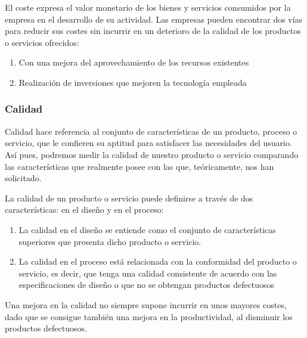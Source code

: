\documentclass[10pt,a4paper,spanish]{report}
\begin{document}
                        El coste expresa el valor monetario de los bienes y servicios consumidos por la empresa en el desarrollo de su actividad. Las empresas pueden encontrar dos vías para reducir sus costes sin incurrir en un deterioro de la calidad de los productos o servicios ofrecidos:

                        \begin{enumerate}[---]
                              \item Con una mejora del aprovechamiento de los recursos existentes
                              \item Realización de inversiones que mejoren la tecnología empleada
                        \end{enumerate}

                  \subsubsection{\textcolor[rgb]{0.9,0.7,0.6}Calidad}

                        Calidad hace referencia al conjunto de características de un producto, proceso o servicio, que le confieren su aptitud para satisfacer las necesidades del usuario. Así pues, podremos medir la calidad de nuestro producto o servicio comparando las características que realmente posee con las que, teóricamente, nos han solicitado.

                        La calidad de un producto o servicio puede definirse a través de dos características: en el diseño y en el proceso:

                        \begin{enumerate}[---]
                              \item La calidad en el diseño se entiende como el conjunto de características superiores que presenta dicho producto o servicio.
                              \item La calidad en el proceso está relacionada con la conformidad del producto o servicio, es decir, que tenga una calidad consistente de acuerdo con las especificaciones de diseño o que no se obtengan productos defectuosos
                        \end{enumerate}

                        Una mejora en la calidad no siempre supone incurrir en unos mayores costes, dado que se consigue también una mejora en la productividad, al disminuir los productos defectuosos.
\end{document}
